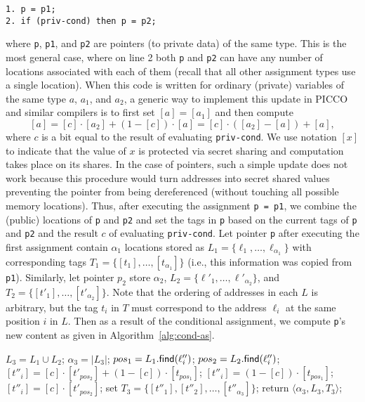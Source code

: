 \documentclass[11pt]{article}
\begin{document}
{\small 
\begin{verbatim}
1. p = p1;
2. if (priv-cond) then p = p2;
\end{verbatim}}
\noindent where \texttt{p}, \texttt{p1}, and \texttt{p2} are pointers
(to private data) of the same type. This is the most general case,
where on line 2 both \texttt{p} and \texttt{p2} can have any number of
locations associated with each of them (recall that all other
assignment types use a single location). When this code is written for
ordinary (private) variables of the same type $a$, $a_1$, and $a_2$, a
generic way to implement this update in PICCO and similar compilers is
to first set $[a] = [a_1]$ and then compute $$[a] = [c] \cdot [a_2] +
(1 - [c]) \cdot [a] = [c] \cdot ([a_2] - [a]) + [a],$$ where $c$ is a
bit equal to the result of evaluating \texttt{priv-cond}. We use
notation $[x]$ to indicate that the value of $x$ is protected via
secret sharing and computation takes place on its shares. In the case
of pointers, such a simple update does not work because this procedure
would turn addresses into secret shared values preventing the pointer
from being dereferenced (without touching all possible memory
locations). Thus, after executing the assignment \texttt{p = p1}, we
combine the (public) locations of \texttt{p} and \texttt{p2} and set
the tags in \texttt{p} based on the current tags of \texttt{p} and
\texttt{p2} and the result $c$ of evaluating \texttt{priv-cond}. Let
pointer \texttt{p} after executing the first assignment contain
$\alpha_1$ locations stored as $L_1 = \{\ell_1, {\ldots},
\ell_{\alpha_1}\}$ with corresponding tags $T_1 = \{[t_1], {\ldots},
[t_{\alpha_1}]\}$ (i.e., this information was copied from
\texttt{p1}). Similarly, let pointer ${p_2}$ store $\alpha_2$, $L_2 =
\{\ell'_1, {\ldots}, \ell'_{\alpha_2}\}$, and $T_2 = \{[t'_1],
{\ldots}, [t'_{\alpha_2}]\}$. Note that the ordering of addresses in
each $L$ is arbitrary, but the tag $t_i$ in $T$ must correspond to the
address $\ell_i$ at the same position $i$ in $L$. Then as a result of
the conditional assignment, we compute \texttt{p}'s new content as
given in Algorithm~\ref{alg:cond-as}.
\begin{algorithm}[h]
\caption{$\langle \alpha_3, L_3, T_3 \rangle \leftarrow {\sf
    CondAssign}(\langle \alpha_1, L_1, T_1 \rangle, \langle \alpha_2$, $L_2,
  T_2 \rangle, [c])$} \label{alg:cond-as}
\begin{algorithmic}[1]
    \STATE $L_3 = L_1 \cup L_2$;
    \STATE $\alpha_3 = |L_3|$; 
    \STATE $pos_1 = L_1.{\sf find}(\ell''_i)$;
    \STATE $pos_2 = L_2.{\sf find}(\ell''_i)$;
    \STATE $[t''_i] = [c] \cdot [t'_{pos_2}] + (1 - [c]) \cdot [t_{pos_1}]$;
    \STATE $[t''_i] = (1 - [c]) \cdot [t_{pos_1}]$;
    \ELSE
    \STATE $[t''_i] = [c] \cdot [t'_{pos_2}]$;
    \ENDIF
    \ENDFOR
    \STATE set $T_3 = \{[t''_1], [t''_2], {\ldots}, [t''_{\alpha_3}]\}$;
    \STATE return $\langle \alpha_3, L_3, T_3 \rangle$;
\end{algorithmic}
\end{algorithm}
\end{document}
